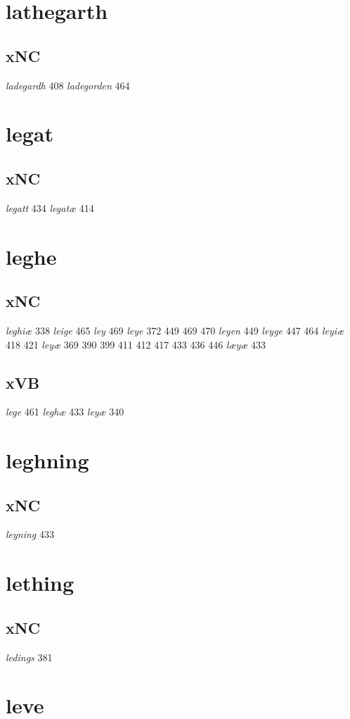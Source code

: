 \documentclass[a4paper,twocolumn]{article}
\begin{document}
\section{lathegarth}
\label{sec:orgc5628d7}
\subsection{xNC}
\label{sec:org4d4f6d4}
\emph{ladegardh} 408 \emph{ladegorden} 464 
\section{legat}
\label{sec:orgad5b1d9}
\subsection{xNC}
\label{sec:org64f106b}
\emph{legatt} 434 \emph{legatæ} 414 
\section{leghe}
\label{sec:org1157602}
\subsection{xNC}
\label{sec:org051a8cc}
\emph{leghiæ} 338 \emph{leige} 465 \emph{ley} 469 \emph{leye} 372 449 469 470 \emph{leyen} 449 \emph{leyge} 447 464 \emph{leyiæ} 418 421 \emph{leyæ} 369 390 399 411 412 417 433 436 446 \emph{læyæ} 433 
\subsection{xVB}
\label{sec:org41755f7}
\emph{lege} 461 \emph{leghæ} 433 \emph{leyæ} 340 
\section{leghning}
\label{sec:orgdc99e08}
\subsection{xNC}
\label{sec:orgda98fe8}
\emph{leyning} 433 
\section{lething}
\label{sec:org474fa41}
\subsection{xNC}
\label{sec:orga415fce}
\emph{ledings} 381 
\section{leve}
\label{sec:org9114404}
\end{document}
